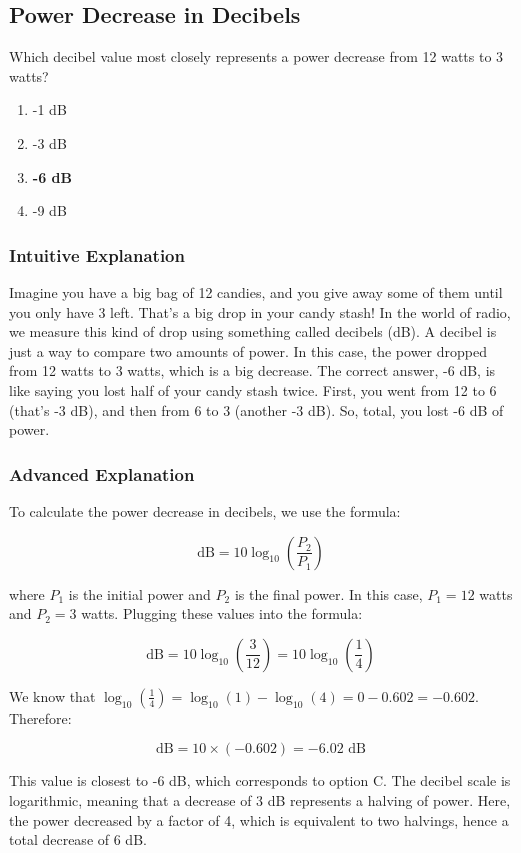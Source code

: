 \subsection{Power Decrease in Decibels}
\label{T5B10}

\begin{tcolorbox}[colback=gray!10!white,colframe=black!75!black,title=T5B10]
Which decibel value most closely represents a power decrease from 12 watts to 3 watts?
\begin{enumerate}[label=\Alph*)]
    \item -1 dB
    \item -3 dB
    \item \textbf{-6 dB}
    \item -9 dB
\end{enumerate}
\end{tcolorbox}

\subsubsection{Intuitive Explanation}
Imagine you have a big bag of 12 candies, and you give away some of them until you only have 3 left. That's a big drop in your candy stash! In the world of radio, we measure this kind of drop using something called decibels (dB). A decibel is just a way to compare two amounts of power. In this case, the power dropped from 12 watts to 3 watts, which is a big decrease. The correct answer, -6 dB, is like saying you lost half of your candy stash twice. First, you went from 12 to 6 (that's -3 dB), and then from 6 to 3 (another -3 dB). So, total, you lost -6 dB of power.

\subsubsection{Advanced Explanation}
To calculate the power decrease in decibels, we use the formula:

\[
\text{dB} = 10 \log_{10}\left(\frac{P_2}{P_1}\right)
\]

where \(P_1\) is the initial power and \(P_2\) is the final power. In this case, \(P_1 = 12\) watts and \(P_2 = 3\) watts. Plugging these values into the formula:

\[
\text{dB} = 10 \log_{10}\left(\frac{3}{12}\right) = 10 \log_{10}\left(\frac{1}{4}\right)
\]

We know that \(\log_{10}\left(\frac{1}{4}\right) = \log_{10}(1) - \log_{10}(4) = 0 - 0.602 = -0.602\). Therefore:

\[
\text{dB} = 10 \times (-0.602) = -6.02 \text{ dB}
\]

This value is closest to -6 dB, which corresponds to option C. The decibel scale is logarithmic, meaning that a decrease of 3 dB represents a halving of power. Here, the power decreased by a factor of 4, which is equivalent to two halvings, hence a total decrease of 6 dB.

